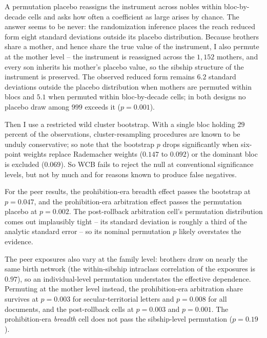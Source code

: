\documentclass[12pt]{article}
\theoremstyle{definition}
\theoremstyle{remark}
\begin{document}
A permutation placebo reassigns the instrument across nobles within bloc-by-decade cells and asks how often a coefficient as large arises by chance. The answer seems to be never: the randomization inference places the reach reduced form eight standard deviations outside its placebo distribution. Because brothers share a mother, and hence share the true value of the instrument, I also permute at the mother level -- the instrument is reassigned across the $1{,}152$ mothers, and every son inherits his mother's placebo value, so the sibship structure of the instrument is preserved. The observed reduced form remains $6.2$ standard deviations outside the placebo distribution when mothers are permuted within blocs and $5.1$ when permuted within bloc-by-decade cells; in both designs no placebo draw among $999$ exceeds it ($p = 0.001$).

Then I use a restricted wild cluster bootstrap. With a single bloc holding $29$ percent of the observations, cluster-resampling procedures are known to be unduly conservative; so note that the bootstrap $p$ drops significantly when six-point weights replace Rademacher weights ($0.147$ to $0.092$) or the dominant bloc is excluded ($0.069$). So WCB fails to reject the null at conventional significance levels, but not by much and for reasons known to produce false negatives.

For the peer results, the prohibition-era breadth effect passes the bootstrap at $p=0.047$, and the prohibition-era arbitration effect passes the permutation placebo at $p=0.002$. The post-rollback arbitration cell's permutation distribution comes out implausibly tight -- its standard deviation is roughly a third of the analytic standard error -- so its nominal permutation $p$ likely overstates the evidence.

The peer exposures also vary at the family level: brothers draw on nearly the same birth network (the within-sibship intraclass correlation of the exposures is $0.97$), so an individual-level permutation understates the effective dependence. Permuting at the mother level instead, the prohibition-era arbitration share survives at $p = 0.003$ for secular-territorial letters and $p = 0.008$ for all documents, and the post-rollback cells at $p = 0.003$ and $p = 0.001$. The prohibition-era \emph{breadth} cell does not pass the sibship-level permutation ($p = 0.19$).
\end{document}
